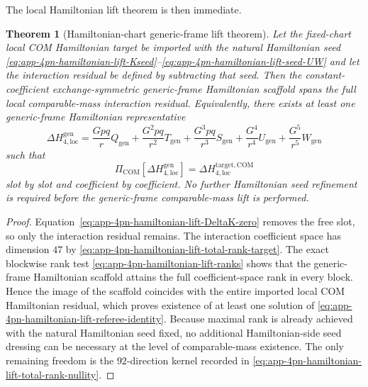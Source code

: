\documentclass[11pt]{article}
\newtheorem{theorem}{Theorem}
\begin{document}
The local Hamiltonian lift theorem is then immediate.
\begin{theorem}[Hamiltonian-chart generic-frame lift theorem]
\label{thm:app-4pn-hamiltonian-chart-lift}
Let the fixed-chart local COM Hamiltonian target be imported with the natural
Hamiltonian seed
\eqref{eq:app-4pn-hamiltonian-lift-Kseed}--\eqref{eq:app-4pn-hamiltonian-lift-seed-UW}
and let the interaction residual be defined by subtracting that seed.  Then the
constant-coefficient exchange-symmetric generic-frame Hamiltonian scaffold
spans the full local comparable-mass interaction residual.  Equivalently, there
exists at least one generic-frame Hamiltonian representative
\begin{equation}
\Delta H_{4,\mathrm{loc}}^{\mathrm{gen}}
=
\frac{Gpq}{r}Q_{\mathrm{gen}}
+
\frac{G^2pq}{r^2}T_{\mathrm{gen}}
+
\frac{G^3pq}{r^3}S_{\mathrm{gen}}
+
\frac{G^4}{r^4}U_{\mathrm{gen}}
+
\frac{G^5}{r^5}W_{\mathrm{gen}}
\label{eq:app-4pn-hamiltonian-lift-generic-residual}
\end{equation}
such that
\begin{equation}
\Pi_{\mathrm{COM}}\!\left[\Delta H_{4,\mathrm{loc}}^{\mathrm{gen}}\right]
=
\Delta H_{4,\mathrm{loc}}^{\mathrm{target,COM}}
\label{eq:app-4pn-hamiltonian-lift-referee-identity}
\end{equation}
slot by slot and coefficient by coefficient.  No further Hamiltonian seed
refinement is required before the generic-frame comparable-mass lift is
performed.
\end{theorem}

\begin{proof}
Equation~\eqref{eq:app-4pn-hamiltonian-lift-DeltaK-zero} removes the free slot,
so only the interaction residual remains.  The interaction coefficient space has
dimension $47$ by
\eqref{eq:app-4pn-hamiltonian-lift-total-rank-target}.  The exact blockwise rank
test \eqref{eq:app-4pn-hamiltonian-lift-ranks} shows that the generic-frame
Hamiltonian scaffold attains the full coefficient-space rank in every block.
Hence the image of the scaffold coincides with the entire imported local COM
Hamiltonian residual, which proves existence of at least one solution of
\eqref{eq:app-4pn-hamiltonian-lift-referee-identity}.  Because maximal rank is
already achieved with the natural Hamiltonian seed fixed, no additional
Hamiltonian-side seed dressing can be necessary at the level of comparable-mass
existence.  The only remaining freedom is the $92$-direction kernel recorded in
\eqref{eq:app-4pn-hamiltonian-lift-total-rank-nullity}.
\end{proof}
\end{document}
